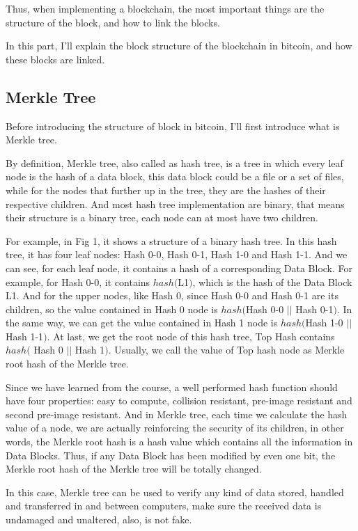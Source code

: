 \documentclass[12pt,a4paper]{article}
\begin{document}
Thus, when implementing a blockchain, the most important things are the structure of the block, and how to link the blocks.

In this part, I'll explain the block structure of the blockchain in bitcoin, and how these blocks are linked.

\subsection{Merkle Tree}

Before introducing the structure of block in bitcoin, I'll first introduce what is Merkle tree.

By definition, Merkle tree, also called as hash tree, is a tree in which every leaf node is the hash of a data block, this data block could be a file or a set of files, while for the nodes that further up in the tree, they are the hashes of their respective children. And most hash tree implementation are binary, that means their structure is a binary tree, each node can at most have two children.

For example, in Fig 1, it shows a structure of a binary hash tree. In this hash tree, it has four leaf nodes: Hash 0-0, Hash 0-1, Hash 1-0 and Hash 1-1. And we can see, for each leaf node, it contains a hash of a corresponding Data Block. For example, for Hash 0-0, it contains $hash($L1$)$, which is the hash of the Data Block L1. And for the upper nodes, like Hash 0, since Hash 0-0 and Hash 0-1 are its children, so the value contained in Hash 0 node is $hash($Hash 0-0 $||$ Hash 0-1$)$. In the same way, we can get the value contained in Hash 1 node is $hash($Hash 1-0 $||$ Hash 1-1$)$. At last, we get the root node of this hash tree, Top Hash contains $hash($ Hash 0 $||$ Hash 1$)$. Usually, we call the value of Top hash node as Merkle root hash of the Merkle tree.

Since we have learned from the course, a well performed hash function should have four properties: easy to compute, collision resistant, pre-image resistant and second pre-image resistant. And in Merkle tree, each time we calculate the hash value of a node, we are actually reinforcing the security of its children, in other words, the Merkle root hash is a hash value which contains all the information in Data Blocks. Thus, if any Data Block has been modified by even one bit, the Merkle root hash of the Merkle tree will be totally changed.

In this case, Merkle tree can be used to verify any kind of data stored, handled and transferred in and between computers, make sure the received data is undamaged and unaltered, also, is not fake.
\end{document}

